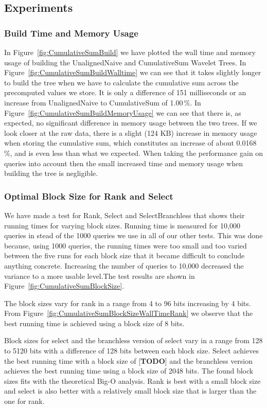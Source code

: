 \subsection{Experiments}

\subsubsection{Build Time and Memory Usage}
In Figure~\ref{fig:CumulativeSumBuild} we have plotted the wall time and memory usage of building the UnalignedNaive and CumulativeSum Wavelet Trees.
In Figure~\ref{fig:CumulativeSumBuildWalltime} we can see that it takes slightly longer to build the tree when we have to calculate the cumulative sum across the precomputed values we store.
It is only a difference of 151 milliseconds or an increase from UnalignedNaive to CumulativeSum of 1.00\,\%.
In Figure~\ref{fig:CumulativeSumBuildMemoryUsage} we can see that there is, as expected, no significant difference in memory usage between the two trees.
If we look closer at the raw data, there is a slight (124 KB) increase in memory usage when storing the cumulative sum, which constitutes an increase of about 0.0168\,\%, and is even less than what we expected.
When taking the performance gain on queries into account then the small increased time and memory usage when building the tree is negligible.


\subsubsection{Optimal Block Size for Rank and Select}
\label{sec:OptimalBlockSizeForRankAndSelect}
We have made a test for Rank, Select and SelectBranchless that shows their running times for varying block sizes.
Running time is measured for 10,000 queries in stead of the 1000 queries we use in all of our other tests. 
This was done because, using 1000 queries, the running times were too small and too varied between the five runs for each block size that it became difficult to conclude anything concrete. 
Increasing the number of queries to 10,000 decreased the variance to a more usable level.The test results are shown in Figure~\ref{fig:CumulativeSumBlockSize}.

The block sizes vary for rank in a range from 4 to 96 bits increasing by 4 bits.
From Figure~\ref{fig:CumulativeSumBlockSizeWallTimeRank} we observe that the best running time is achieved using a block size of 8 bits. 

Block sizes for select and the branchless version of select vary in a range from 128 to 5120 bits with a difference of 128 bits between each block size. 
Select achieves the best running time with a block size of [\textbf{TODO}] and the branchless version achieves the best running time using a block size of 2048 bits.
The found block sizes fits with the theoretical Big-O analysis.
Rank is best with a small block size and select is also better with a relatively small block size that is larger than the one for rank.


